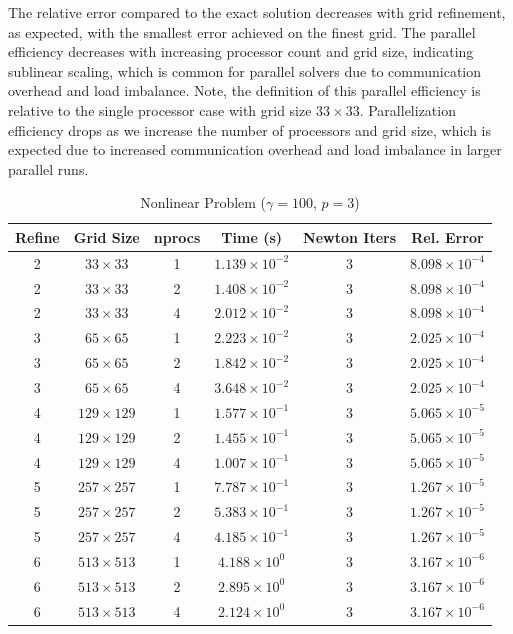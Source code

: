 \documentclass[12pt]{article}
\begin{document}
The relative error compared to the exact solution decreases with grid refinement, as expected, with the smallest error achieved on the finest grid. The parallel efficiency decreases with increasing processor count and grid size, indicating sublinear scaling, which is common for parallel solvers due to communication overhead and load imbalance. Note, the definition of this parallel efficiency is relative to the single processor case with grid size $33 \times 33$. Parallelization efficiency drops as we increase the number of processors and grid size, which is expected due to increased communication overhead and load imbalance in larger parallel runs. 
\begin{table}[h]
\centering
\caption{Nonlinear Problem ($\gamma=100$, $p=3$)}
\label{tab:q8_scaling}
\begin{tabular}{cccccc}
\hline
\textbf{Refine} & \textbf{Grid Size} & \textbf{nprocs} & \textbf{Time (s)} & \textbf{Newton Iters} & \textbf{Rel. Error} \\
\hline
2 & $33 \times 33$ & 1 & $1.139 \times 10^{-2}$ & 3 & $8.098 \times 10^{-4}$ \\
2 & $33 \times 33$ & 2 & $1.408 \times 10^{-2}$ & 3 & $8.098 \times 10^{-4}$ \\
2 & $33 \times 33$ & 4 & $2.012 \times 10^{-2}$ & 3 & $8.098 \times 10^{-4}$ \\
\hline
3 & $65 \times 65$ & 1 & $2.223 \times 10^{-2}$ & 3 & $2.025 \times 10^{-4}$ \\
3 & $65 \times 65$ & 2 & $1.842 \times 10^{-2}$ & 3 & $2.025 \times 10^{-4}$ \\
3 & $65 \times 65$ & 4 & $3.648 \times 10^{-2}$ & 3 & $2.025 \times 10^{-4}$ \\
\hline
4 & $129 \times 129$ & 1 & $1.577 \times 10^{-1}$ & 3 & $5.065 \times 10^{-5}$ \\
4 & $129 \times 129$ & 2 & $1.455 \times 10^{-1}$ & 3 & $5.065 \times 10^{-5}$ \\
4 & $129 \times 129$ & 4 & $1.007 \times 10^{-1}$ & 3 & $5.065 \times 10^{-5}$ \\
\hline
5 & $257 \times 257$ & 1 & $7.787 \times 10^{-1}$ & 3 & $1.267 \times 10^{-5}$ \\
5 & $257 \times 257$ & 2 & $5.383 \times 10^{-1}$ & 3 & $1.267 \times 10^{-5}$ \\
5 & $257 \times 257$ & 4 & $4.185 \times 10^{-1}$ & 3 & $1.267 \times 10^{-5}$ \\
\hline
6 & $513 \times 513$ & 1 & $4.188 \times 10^{0}$ & 3 & $3.167 \times 10^{-6}$ \\
6 & $513 \times 513$ & 2 & $2.895 \times 10^{0}$ & 3 & $3.167 \times 10^{-6}$ \\
6 & $513 \times 513$ & 4 & $2.124 \times 10^{0}$ & 3 & $3.167 \times 10^{-6}$ \\
\hline
\end{tabular}
\end{table}
\end{document}
